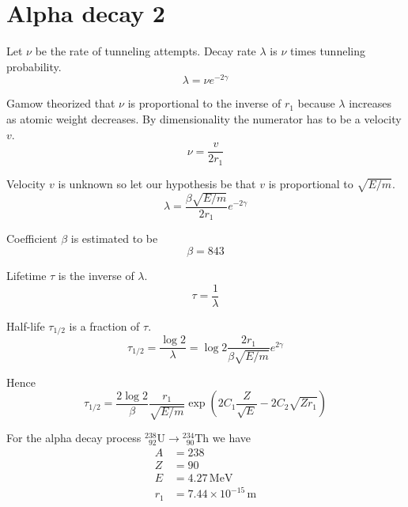 


\section*{Alpha decay 2}

Let $\nu$ be the rate of tunneling attempts.
Decay rate $\lambda$ is $\nu$ times tunneling probability.
\begin{equation*}
\lambda=\nu e^{-2\gamma}
\end{equation*}

Gamow theorized that $\nu$ is proportional to the inverse of $r_1$
because $\lambda$ increases as atomic weight decreases.
By dimensionality the numerator has to be a velocity $v$.
\begin{equation*}
\nu=\frac{v}{2r_1}
\end{equation*}

Velocity $v$ is unknown so let our hypothesis be that $v$ is proportional to $\sqrt{E/m}$.
\begin{equation*}
\lambda=\frac{\beta\sqrt{E/m}}{2r_1}e^{-2\gamma}
\end{equation*}

Coefficient $\beta$ is estimated to be
\begin{equation*}
\beta=843
\end{equation*}

Lifetime $\tau$ is the inverse of $\lambda$.
\begin{equation*}
\tau=\frac{1}{\lambda}
\end{equation*}

Half-life $\tau_{1/2}$ is a fraction of $\tau$.
\begin{equation*}
\tau_{1/2}=\frac{\log2}{\lambda}=\log2\frac{2r_1}{\beta\sqrt{E/m}}e^{2\gamma}
\end{equation*}

Hence
\begin{equation*}
\tau_{1/2}=\frac{2\log2}{\beta}\frac{r_1}{\sqrt{E/m}}
\exp\left(2C_1\frac{Z}{\sqrt E}-2C_2\sqrt{Zr_1}\right)
\end{equation*}

For the alpha decay process
${}^{238}_{\phantom{0}92}\mathrm U\rightarrow{}^{234}_{\phantom{0}90}\mathrm{Th}$
we have
\begin{align*}
A&=238
\\
Z&=90
\\
E&=4.27\,\text{MeV}
\\
r_1&=7.44\times10^{-15}\,\text{m}
\end{align*}

